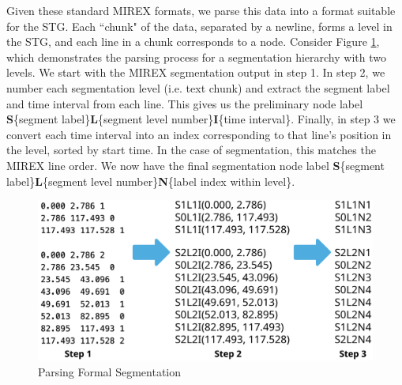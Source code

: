\documentclass{article}
\begin{document}
Given these standard MIREX formats, we parse this data into a format suitable for the STG. Each ``chunk" of the data, separated by a newline, forms a level in the STG, and each line in a chunk corresponds to a node. Consider Figure \ref{fig:form_parse}, which demonstrates the parsing process for a segmentation hierarchy with two levels. We start with the MIREX segmentation output in step 1. In step 2, we number each segmentation level (i.e. text chunk) and extract the segment label and time interval from each line. This gives us the preliminary node label \textbf{S}\{segment label\}\textbf{L}\{segment level number\}\textbf{I}\{time interval\}. Finally, in step 3 we convert each time interval into an index corresponding to that line's position in the level, sorted by start time. In the case of segmentation, this matches the MIREX line order. We now have the final segmentation node label \textbf{S}\{segment label\}\textbf{L}\{segment level number\}\textbf{N}\{label index within level\}. 

\begin{figure}[h!]
  \centering
  \includegraphics[width=\linewidth]{figs/form_parse}
  \caption{Parsing Formal Segmentation}
  \label{fig:form_parse}
\end{figure}
\end{document}
